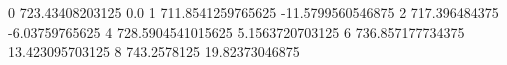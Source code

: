 0 723.43408203125 0.0
1 711.8541259765625 -11.5799560546875
2 717.396484375 -6.03759765625
4 728.5904541015625 5.1563720703125
6 736.857177734375 13.423095703125
8 743.2578125 19.82373046875
